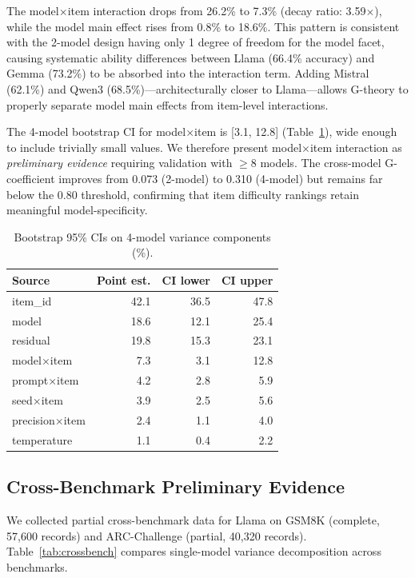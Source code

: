 \documentclass[letterpaper]{article}
\begin{document}
The model$\times$item interaction drops from 26.2\% to 7.3\% (decay ratio: 3.59$\times$), while the model main effect rises from 0.8\% to 18.6\%. This pattern is consistent with the 2-model design having only 1 degree of freedom for the model facet, causing systematic ability differences between Llama (66.4\% accuracy) and Gemma (73.2\%) to be absorbed into the interaction term. Adding Mistral (62.1\%) and Qwen3 (68.5\%)---architecturally closer to Llama---allows G-theory to properly separate model main effects from item-level interactions.

The 4-model bootstrap CI for model$\times$item is [3.1, 12.8] (Table~\ref{tab:bootstrap}), wide enough to include trivially small values. We therefore present model$\times$item interaction as \emph{preliminary evidence} requiring validation with $\geq$8 models. The cross-model G-coefficient improves from 0.073 (2-model) to 0.310 (4-model) but remains far below the 0.80 threshold, confirming that item difficulty rankings retain meaningful model-specificity.

\begin{table}[t]
\centering
\caption{Bootstrap 95\% CIs on 4-model variance components (\%).}
\label{tab:bootstrap}
\small
\begin{tabular}{lrrr}
\toprule
Source & Point est. & CI lower & CI upper \\
\midrule
item\_id & 42.1 & 36.5 & 47.8 \\
model & 18.6 & 12.1 & 25.4 \\
residual & 19.8 & 15.3 & 23.1 \\
model$\times$item & 7.3 & 3.1 & 12.8 \\
prompt$\times$item & 4.2 & 2.8 & 5.9 \\
seed$\times$item & 3.9 & 2.5 & 5.6 \\
precision$\times$item & 2.4 & 1.1 & 4.0 \\
temperature & 1.1 & 0.4 & 2.2 \\
\bottomrule
\end{tabular}
\end{table}

\subsection{Cross-Benchmark Preliminary Evidence}
\label{sec:crossbench}

We collected partial cross-benchmark data for Llama on GSM8K (complete, 57,600 records) and ARC-Challenge (partial, 40,320 records). Table~\ref{tab:crossbench} compares single-model variance decomposition across benchmarks.
\end{document}
